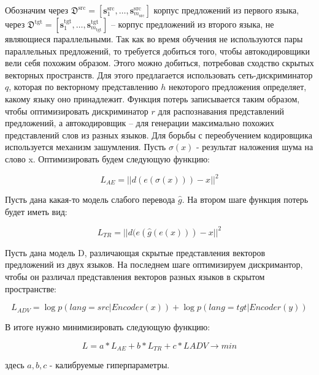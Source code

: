 \documentclass[12pt,twoside]{article}
\begin{document}
Обозначим через $\mathfrak{D}^{\text{src}} = [\mathbf{s}_1^{\text{src}}, \dots, \mathbf{s}_{m_\text{src}}^{\text{src}}]$ корпус предложений из первого языка, через $\mathfrak{D}^{\text{tgt}} = [\mathbf{s}_1^{\text{tgt}}, \dots, \mathbf{s}_{m_\text{tgt}}^{\text{tgt}}]$ -- корпус предложений из второго языка, не являющиеся параллельными. Так как во время обучения не используются пары параллельных предложений, то требуется добиться того, чтобы автокодировщики вели себя похожим образом. Этого можно добиться, потребовав сходство скрытых векторных пространств. Для этого предлагается использовать сеть-дискриминатор $q$, которая по векторному представлению $h$ некоторого предложения определяет, какому языку оно принадлежит. Функция потерь записывается таким образом, чтобы оптимизировать дискриминатор $r$ для распознавания представлений предложений, а автокодировщик -- для генерации максимально похожих представлений слов из разных языков. Для борьбы с переобучением кодировщика используется механизм зашумления. Пусть $\sigma(x)$ - результат наложения шума на слово x.  Оптимизировать будем  следующую функцию:

$$L_{AE} = ||d(e(\sigma(x)))-x||^2$$

Пусть дана какая-то модель слабого перевода $\hat{g}$. На втором шаге  функция потерь будет иметь вид:

$$L_{TR} = ||d(e(\hat{g}(e(x))) - x||^2$$

Пусть дана модель D, различающая скрытые представления векторов предложений из двух языков. На последнем шаге оптимизируем дискримантор, чтобы он различал представления векторов разных языков в скрытом пространстве:

$$L_{ADV} = \log p(lang = src| Encoder(x)) + \log p(lang = tgt|Encoder(y))$$

В итоге нужно минимизировать следующую функцию:

$$L = a*L_{AE} + b*L_{TR}+c*L{ADV} \longrightarrow min$$

здесь $a,b,c$ - калибруемые гиперпараметры.





\end{document}
